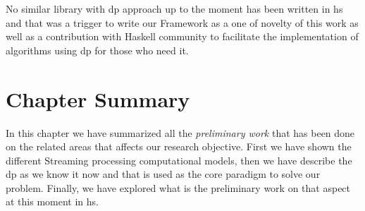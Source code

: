 No similar library with \acrshort{dp} approach up to the moment has been written in \acrlong{hs} and that was a trigger to write our Framework as a one of novelty of this work as well as a contribution
with Haskell community to facilitate the implementation of algorithms using \acrshort{dp} for those who need it.

\section{Chapter Summary}
In this chapter we have summarized all the \emph{preliminary work} that has been done on the related areas that affects our research objective.
First we have shown the different Streaming processing computational models, then we have describe the \acrshort{dp} as we know it now and that is used 
as the core paradigm to solve our problem. Finally, we have explored what is the preliminary work on that aspect at this moment in \acrshort{hs}. 
